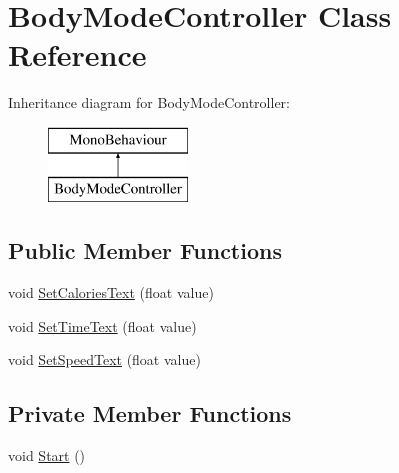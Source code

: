 \hypertarget{class_body_mode_controller}{}\section{Body\+Mode\+Controller Class Reference}
\label{class_body_mode_controller}
Inheritance diagram for Body\+Mode\+Controller\+:\begin{figure}[H]
\begin{center}
\leavevmode
\includegraphics[height=2.000000cm]{class_body_mode_controller}
\end{center}
\end{figure}
\subsection*{Public Member Functions}
\begin{DoxyCompactItemize}
\item 
void \mbox{\hyperlink{class_body_mode_controller_aca6fa173e7dd4bce1c7919bcfff20332}{Set\+Calories\+Text}} (float value)
\item 
void \mbox{\hyperlink{class_body_mode_controller_aa68961f51610549f3d0adf6b67403d92}{Set\+Time\+Text}} (float value)
\item 
void \mbox{\hyperlink{class_body_mode_controller_af2c43f49b719a00d7ca1f5dc843e455e}{Set\+Speed\+Text}} (float value)
\end{DoxyCompactItemize}
\subsection*{Private Member Functions}
\begin{DoxyCompactItemize}
\item 
void \mbox{\hyperlink{class_body_mode_controller_a0f78a4335940305ccea1b96751afe664}{Start}} ()
\end{DoxyCompactItemize}
